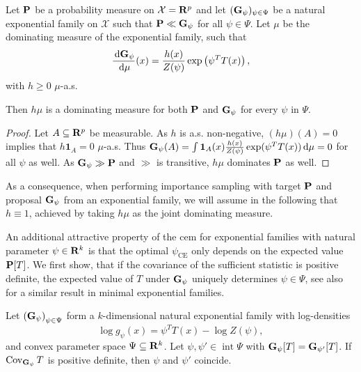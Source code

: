 \begin{lemma}
    Let $\P$ be a probability measure on $\mathcal X = \R^{p}$ and let $(\G_{\psi})_{\psi\in\Psi}$ be a natural exponential family on $\mathcal X$ such that $\P \ll \G_{\psi}$ for all $\psi \in \Psi$. Let $\mu$ be the dominating measure of the exponential family, such that 
    $$
        \rnd{\G_{\psi}}{\mu}(x) = \frac{h(x)}{Z(\psi)} \exp \left( \psi^{T}T(x)\right),
    $$
    with $h\geq 0$ $\mu$-a.s.
    
    Then $h\mu$ is a dominating measure for both $\P$ and $\G_{\psi}$ for every $\psi$ in $\Psi$. 
\end{lemma}
\begin{proof}
    Let $A \subseteq \R^{p}$ be measurable. As $h$ is a.s. non-negative, $(h\mu)(A) = 0$ implies that $h\mathbf 1 _{A} = 0$  $\mu$-a.s. 
    Thus $\G_{\psi}(A) = \int \mathbf 1 _{A}(x) \frac{h(x)}{Z(\psi)}\exp(\psi^{T}T(x)) \d \mu = 0$ for all $\psi$ as well. 
    As $\G_{\psi} \gg \P$ and $ \gg $ is transitive, $h\mu$ dominates $\P$ as well.
\end{proof}

As a consequence, when performing importance sampling with target $\P$ and proposal $\G_{\psi}$ from an exponential family, we will assume in the following that $h \equiv 1$, achieved by taking $h\mu$ as the joint dominating measure. 

An additional attractive property of the \gls{cem} for exponential families with natural parameter $\psi \in \R^{k}$ is that the optimal $\psi_{\text{CE}}$ only depends on the expected value $\P [T]$. We first show, that if the covariance of the sufficient statistic is positive definite, the expected value of $T$ under $\G_{\psi}$ uniquely determines $\psi \in \Psi$, see also \citep[Corollary 2.5]{Brown1986Fundamentals} for a similar result in minimal exponential families.
\begin{lemma}
    \label{lem:psiunique}
    Let $\left( \G_{\psi} \right)_{\psi \in \Psi}$ form a $k$-dimensional natural exponential family with log-densities 
    $$
    \log g_{\psi}(x) = \psi^{T} T(x) - \log Z(\psi),
    $$
    and convex parameter space $\Psi \subseteq \R^{k}$. 
    Let $\psi, \psi' \in \operatorname{int} \Psi$ with $\G_{\psi} [T] = \G_{\psi'} [T]$. If $\cov_{\G_{\psi}} T$ is positive definite, then $\psi$ and $\psi'$ coincide.
\end{lemma}

